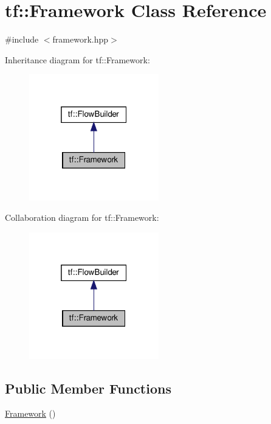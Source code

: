 \hypertarget{classtf_1_1Framework}{}\section{tf\+:\+:Framework Class Reference}
\label{classtf_1_1Framework}


{\ttfamily \#include $<$framework.\+hpp$>$}



Inheritance diagram for tf\+:\+:Framework\+:\nopagebreak
\begin{figure}[H]
\begin{center}
\leavevmode
\includegraphics[width=160pt]{classtf_1_1Framework__inherit__graph}
\end{center}
\end{figure}


Collaboration diagram for tf\+:\+:Framework\+:\nopagebreak
\begin{figure}[H]
\begin{center}
\leavevmode
\includegraphics[width=160pt]{classtf_1_1Framework__coll__graph}
\end{center}
\end{figure}
\subsection*{Public Member Functions}
\begin{DoxyCompactItemize}
\item 
\hyperlink{classtf_1_1Framework_a4a9bb59001066e07cbcc9c8f2debb75c}{Framework} ()
\end{DoxyCompactItemize}

